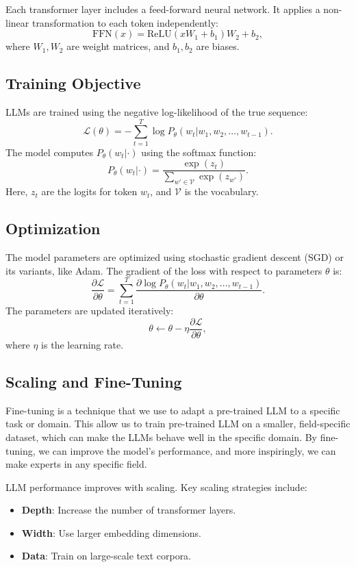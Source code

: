 \documentclass[fleqn,10pt]{SelfArx} %
\begin{document}
Each transformer layer includes a feed-forward neural network. It applies a non-linear transformation to each token independently:
\[
\text{FFN}(x) = \text{ReLU}(xW_1 + b_1)W_2 + b_2,
\]
where \(W_1, W_2\) are weight matrices, and \(b_1, b_2\) are biases.

\subsection{Training Objective}

LLMs are trained using the negative log-likelihood of the true sequence:
\[
\mathcal{L}(\theta) = -\sum_{t=1}^T \log P_\theta(w_t | w_1, w_2, \ldots, w_{t-1}).
\]
The model computes \(P_\theta(w_t | \cdot)\) using the softmax function:
\[
P_\theta(w_t | \cdot) = \frac{\exp(z_t)}{\sum_{w' \in \mathcal{V}} \exp(z_{w'})}.
\]
Here, \(z_t\) are the logits for token \(w_t\), and \(\mathcal{V}\) is the vocabulary.

\subsection{Optimization}

The model parameters are optimized using stochastic gradient descent (SGD) or its variants, like Adam. The gradient of the loss with respect to parameters \(\theta\) is:
\[
\frac{\partial \mathcal{L}}{\partial \theta} = \sum_{t=1}^T \frac{\partial \log P_\theta(w_t | w_1, w_2, \ldots, w_{t-1})}{\partial \theta}.
\]
The parameters are updated iteratively:
\[
\theta \leftarrow \theta - \eta \frac{\partial \mathcal{L}}{\partial \theta},
\]
where \(\eta\) is the learning rate.

\subsection{Scaling and Fine-Tuning}
Fine-tuning is a technique that we use to adapt a pre-trained LLM to a specific task or domain. This allow us to train pre-trained LLM on a smaller, field-specific dataset, which can make the LLMs behave well in the specific domain. By fine-tuning, we can improve the model's performance, and more inspiringly, we can make experts in any specific field.

LLM performance improves with scaling. Key scaling strategies include:
\begin{itemize}
    \item \textbf{Depth}: Increase the number of transformer layers.
    \item \textbf{Width}: Use larger embedding dimensions.
    \item \textbf{Data}: Train on large-scale text corpora.
\end{itemize}
\end{document}
